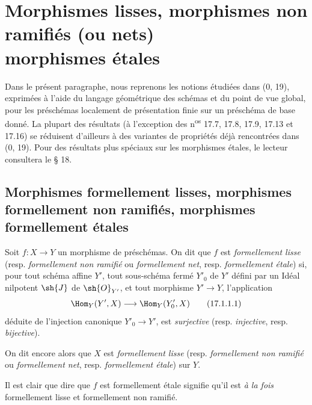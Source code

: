 \section[Morphismes lisses, morphismes non ramifiés (ou nets) morphismes étales]{Morphismes lisses, morphismes non ramifiés (ou nets)\\morphismes étales}
\label{section:IV.17}

Dans le présent paragraphe, nous reprenons les notions étudiées dans (0, 19), exprimées à l'aide du langage géométrique des schémas et du point de vue global, pour les préschémas localement de présentation finie sur un préschéma de base donné. La plupart des résultats (à l'exception des n\textsuperscript{os} 17.7, 17.8, 17.9, 17.13 et 17.16) se réduisent d'ailleurs à des variantes de propriétés déjà rencontrées dans (0, 19). Pour des résultats plus spéciaux sur les morphismes étales, le lecteur consultera le § 18.

\subsection{Morphismes formellement lisses, morphismes formellement non ramifiés, morphismes formellement étales}
\label{subsection:IV.17.1}

\begin{definition}[17.1.1]
\label{IV.17.1.1}
Soit $f:X\to Y$ un morphisme de préschémas. On dit que $f$ est \emph{formellement lisse} (resp. \emph{formellement non ramifié} ou \emph{formellement net}, resp. \emph{formellement étale}) si, pour tout schéma affine $Y'$, tout sous-schéma fermé $Y'_0$ de $Y'$ défini par un Idéal nilpotent $\sh{J}$ de $\sh{O}_{Y'}$, et tout morphisme $Y'\to Y$, l'application
\[
\label{IV.17.1.1.1}
  \Hom_Y(Y',X)\longrightarrow\Hom_Y(Y'_0,X)
  \tag{17.1.1.1}
\]
déduite de l'injection canonique $Y'_0\to Y'$, est \emph{surjective} (resp. \emph{injective}, resp. \emph{bijective}).
\end{definition}

On dit encore alors que $X$ est \emph{formellement lisse} (resp. \emph{formellement non ramifié} ou \emph{formellement net}, resp. \emph{formellement étale}) sur $Y$.

Il est clair que dire que $f$ est formellement étale signifie qu'il est \emph{à la fois} formellement lisse et formellement non ramifié.

